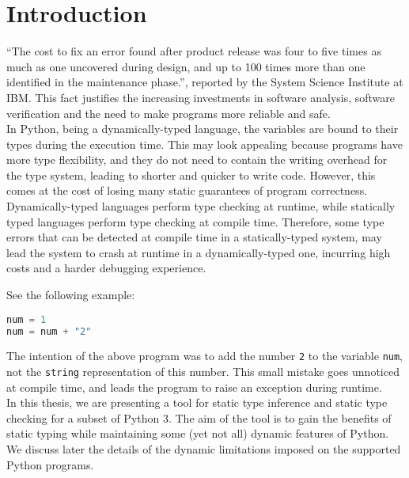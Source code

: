 
\chapter{Introduction}\label{chapter:introduction}

“The cost to fix an error found after product release was four to five times as much as one uncovered during design, and up to 100 times more than one identified in the maintenance phase.”, reported by the System Science Institute at IBM. This fact justifies the increasing investments in software analysis, software verification and the need to make programs more reliable and safe.\\

In Python, being a dynamically-typed language, the variables are bound to their types during the execution time. This may look appealing because programs have more type flexibility, and they do not need to contain the writing overhead for the type system, leading to shorter and quicker to write code. However, this comes at the cost of losing many static guarantees of program correctness. Dynamically-typed languages perform type checking at runtime, while statically typed languages perform type checking at compile time. Therefore, some type errors that can be detected at compile time in a statically-typed system, may lead the system to crash at runtime in a dynamically-typed one, incurring high costs and a harder debugging experience.

See the following example:

\begin{lstlisting}[language=python]
num = 1
num = num + "2"
\end{lstlisting}



The intention of the above program was to add the number \lstinline|2| to the variable \lstinline|num|, not the \lstinline|string| representation of this number. This small mistake goes unnoticed at compile time, and leads the program to raise an exception during runtime.\\

In this thesis, we are presenting a tool for static type inference and static type checking for a subset of Python 3. The aim of the tool is to gain the benefits of static typing while maintaining some (yet not all) dynamic features of Python. We discuss later the details of the dynamic limitations imposed on the supported Python programs.\\

